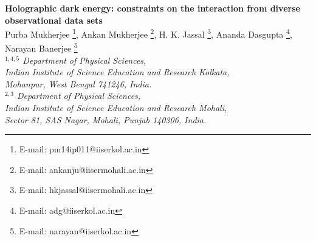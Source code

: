 \documentclass[11pt]{article}
\begin{document}
\begin{center}
{\Large\bf Holographic dark energy: constraints on the interaction from diverse observational data sets}
\\[15mm]
Purba Mukherjee \footnote{E-mail: pm14ip011@iiserkol.ac.in},
Ankan Mukherjee \footnote{E-mail: ankanju@iisermohali.ac.in},
H. K. Jassal \footnote{E-mail: hkjassal@iisermohali.ac.in},
Ananda Dasgupta \footnote{E-mail: adg@iiserkol.ac.in},
Narayan Banerjee \footnote{E-mail: narayan@iiserkol.ac.in}\\[5mm]


{\em $^{1,4,5}$ Department of Physical Sciences,~~\\Indian Institute of Science Education and Research Kolkata,\\ Mohanpur, West Bengal 741246, India.}\\[2mm]
{\em $^{2,3}$ Department of Physical Sciences,~~\\Indian Institute of Science Education and Research Mohali, \\ Sector 81, SAS Nagar, Mohali, Punjab 140306, India.}\\[15mm]
\end{center}

\vspace{0.5cm}
\vspace{0.5cm}
\pagestyle{myheadings}
\newcommand{\be}{\begin{equation}}
\newcommand{\ee}{\end{equation}}
\newcommand{\bea}{\begin{eqnarray}}
\newcommand{\eea}{\end{eqnarray}}


\begin{abstract}
The present work deals with holographic dark energy models with Hubble horizon as the infra-red cut-off. The interaction rate between dark energy and dark matter has been reconstructed with three different choices of the interaction term. It is shown that the coupling parameter of the interaction term should evolve with redshift to allow the successful transition from decelerated to accelerated phase of expansion. Constraints on the model parameters are obtained from Markov Chain Monte Carlo (MCMC) analysis using the supernova distance modulus data and observational measurements of the Hubble parameter. Results show that the model with the coupling parameter increasing with redshift ($z$) or equivalently decreasing with the evolution, are ruled out. On the other hand, coupling parameters, increasing or slowly varying with the evolution, are consistent with the observed evolution scenario. A Bayesian evidence calculation has been carried out for statistical selection of the reconstructed models. Though the kinematical parameters are well behaved for these models, the physical variables which determine the nature of the components in the matter sector, are not at all realistic. We have concluded that the existence of spatial curvature is essential for this particular type of dark energy models.
\end{abstract}
\end{document}
